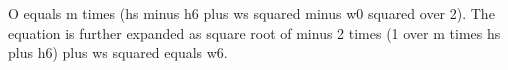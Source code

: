 O equals m times (hs minus h6 plus ws squared minus w0 squared over 2). The equation is further expanded as square root of minus 2 times (1 over m times hs plus h6) plus ws squared equals w6.